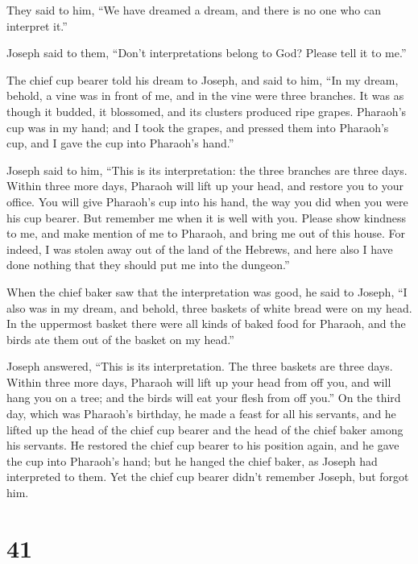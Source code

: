  They said to him, ``We have dreamed a dream, and there is
no one who can interpret it.''

Joseph said to them, ``Don't interpretations belong to God? Please tell
it to me.''

 The chief cup bearer told his dream to Joseph, and said
to him, ``In my dream, behold, a vine was in front of me,
 and in the vine were three branches. It was as though it
budded, it blossomed, and its clusters produced ripe grapes.
 Pharaoh's cup was in my hand; and I took the grapes, and
pressed them into Pharaoh's cup, and I gave the cup into Pharaoh's
hand.''

 Joseph said to him, ``This is its interpretation: the
three branches are three days.  Within three more days,
Pharaoh will lift up your head, and restore you to your office. You will
give Pharaoh's cup into his hand, the way you did when you were his cup
bearer.  But remember me when it is well with you. Please
show kindness to me, and make mention of me to Pharaoh, and bring me out
of this house.  For indeed, I was stolen away out of the
land of the Hebrews, and here also I have done nothing that they should
put me into the dungeon.''

 When the chief baker saw that the interpretation was
good, he said to Joseph, ``I also was in my dream, and behold, three
baskets of white bread were on my head.  In the uppermost
basket there were all kinds of baked food for Pharaoh, and the birds ate
them out of the basket on my head.''

 Joseph answered, ``This is its interpretation. The three
baskets are three days.  Within three more days, Pharaoh
will lift up your head from off you, and will hang you on a tree; and
the birds will eat your flesh from off you.''  On the
third day, which was Pharaoh's birthday, he made a feast for all his
servants, and he lifted up the head of the chief cup bearer and the head
of the chief baker among his servants.  He restored the
chief cup bearer to his position again, and he gave the cup into
Pharaoh's hand;  but he hanged the chief baker, as Joseph
had interpreted to them.  Yet the chief cup bearer didn't
remember Joseph, but forgot him.

\hypertarget{section-40}{%
\section{41}\label{section-40}}

